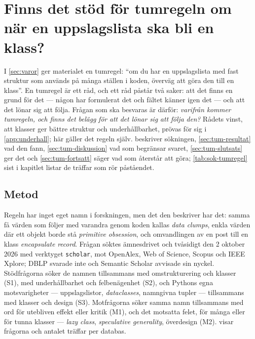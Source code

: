 \chapter{Finns det stöd för tumregeln om när en uppslagslista ska bli en klass?}
\label{app:tumregel}

I \cref{sec:varor} ger materialet en tumregel: \enquote{om du har en
uppslagslista med fast struktur som används på många ställen i koden,
överväg att göra den till en klass}.  En tumregel är ett råd, och ett
råd påstår två saker: att det finns en grund för det --- någon har
formulerat det och fältet känner igen det --- och att det lönar sig att
följa.  Frågan som ska besvaras är därför: \emph{varifrån kommer
tumregeln, och finns det belägg för att det lönar sig att följa den?}
Rådets vinst, att klasser ger bättre struktur och underhållbarhet, prövas
för sig i \cref{app:underhall}; här gäller det regeln själv.
 beskriver sökningen, \cref{sec:tum-resultat} vad
den fann, \cref{sec:tum-diskussion} vad som begränsar svaret,
\cref{sec:tum-slutsats} ger det och \cref{sec:tum-fortsatt} säger vad
som återstår att göra; \cref{tab:sok-tumregel} sist i kapitlet listar de
träffar som rör påståendet.

\section{Metod}
\label{sec:tum-metod}

Regeln har inget eget namn i forskningen, men det den beskriver har det:
samma få värden som följer med varandra genom koden kallas \emph{data
clumps}, enkla värden där ett objekt borde stå \emph{primitive
obsession}, och omvandlingen av en post till en klass \emph{encapsulate
record}.  Frågan söktes ämnesdrivet och tvåsidigt den 2 oktober 2026 med
verktyget \texttt{scholar}, mot OpenAlex, Web of Science, Scopus och IEEE
Xplore; DBLP svarade inte och Semantic Scholar avvisade sin nyckel.
Stödfrågorna söker de namnen tillsammans med omstrukturering och klasser
(S1), med underhållbarhet och felbenägenhet (S2), och Pythons egna
motsvarigheter --- uppslagslistor, \emph{dataclasses}, namngivna tupler
--- tillsammans med klasser och design (S3).  Motfrågorna söker samma
namn tillsammans med ord för utebliven effekt eller kritik (M1), och det
motsatta felet, för många eller för tunna klasser --- \emph{lazy class},
\emph{speculative generality}, överdesign (M2).
 visar frågorna och antalet träffar per
databas.


